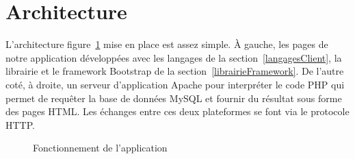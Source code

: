 \documentclass{sigplanconf}
\begin{document}
\section{Architecture}
L'architecture figure~\ref{fonctionnementAppli} mise en place est assez simple. À gauche, les pages de notre application développées avec les langages de la section~\ref{langagesClient}, la librairie et le framework Bootstrap de la section~\ref{librairieFramework}. De l'autre coté, à droite, un serveur d'application Apache pour interpréter le code PHP qui permet de requêter la base de données MySQL et fournir du résultat sous forme des pages HTML. Les échanges entre ces deux plateformes se font via le protocole HTTP.
\begin{figure}
\begin{center}
\end{center}
\caption{Fonctionnement de l'application}\label{fonctionnementAppli}
\end{figure}
\end{document}
